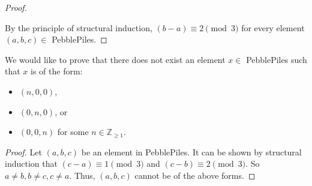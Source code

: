 \documentclass[12pt]{article}
\begin{document}
\begin{enumerate}
\begin{tasks}
\begin{proof}
\begin{itemize}
                    \end{itemize}
                    By the principle of structural induction, $(b-a)\equiv 2\pmod{3}$ for every element $(a,b,c)\in$ PebblePiles.
                \end{proof}
            \task We would like to prove that there does not exist an element $x\in$ PebblePiles such that $x$ is of the form:
                \begin{itemize}
                    \item $(n,0,0)$,
                    \item $(0,n,0)$, or 
                    \item $(0,0,n)$ for some $n\in\mathbb{Z}_{\geq 1}$.
                \end{itemize}
                \begin{proof}
                    Let $(a,b,c)$ be an element in PebblePiles. It can be shown by structural induction that $(c-a)\equiv 1\pmod{3}$ and $(c-b)\equiv 2\pmod{3}$. So $a\neq b, b\neq c, c\neq a$. Thus, $(a,b,c)$ cannot be of the above forms.
                \end{proof}
        \end{tasks}


\end{enumerate}
\end{document}
